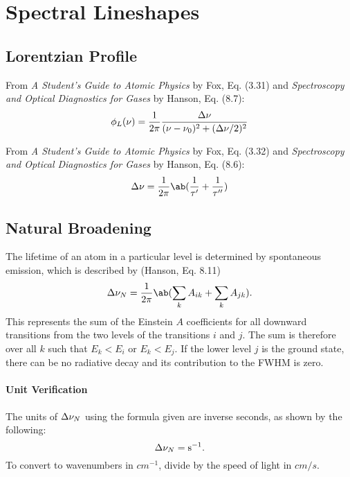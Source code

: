 \documentclass[11pt, twoside, fleqn]{report}
\begin{document}
\section{Spectral Lineshapes}

\subsection{Lorentzian Profile}

From \textit{A Student's Guide to Atomic Physics} by Fox, Eq. (3.31) and \textit{Spectroscopy and Optical Diagnostics for Gases} by Hanson, Eq. (8.7):
\begin{equation*}
    \phi_{L}(\nu) = \frac{1}{2\pi}\frac{\adif{\nu}}{(\nu - \nu_{0})^{2} + (\adif{\nu}/2)^{2}}
\end{equation*}

From \textit{A Student's Guide to Atomic Physics} by Fox, Eq. (3.32) and \textit{Spectroscopy and Optical Diagnostics for Gases} by Hanson, Eq. (8.6):
\begin{equation*}
    \adif{\nu} = \frac{1}{2\pi}\ab(\frac{1}{\tau'} + \frac{1}{\tau''})
\end{equation*}

\subsection{Natural Broadening}

The lifetime of an atom in a particular level is determined by spontaneous emission, which is described by (Hanson, Eq. 8.11)
\begin{equation*}
    \adif{\nu}_{N} = \frac{1}{2\pi}\ab(\sum_{k} A_{ik} + \sum_{k} A_{jk}).
\end{equation*}
This represents the sum of the Einstein $A$ coefficients for all downward transitions from the two levels of the transitions $i$ and $j$. The sum is therefore over all $k$ such that $E_{k} < E_{i}$ or $E_{k} < E_{j}$. If the lower level $j$ is the ground state, there can be no radiative decay and its contribution to the FWHM is zero.

\paragraph{Unit Verification}

The units of $\adif{\nu}_{N}$ using the formula given are inverse seconds, as shown by the following:
\begin{equation*}
    \adif{\nu}_{N} = \unit{s^{-1}}.
\end{equation*}
To convert to wavenumbers in $\unit{cm^{-1}}$, divide by the speed of light in $\unit{cm/s}$.
\end{document}
